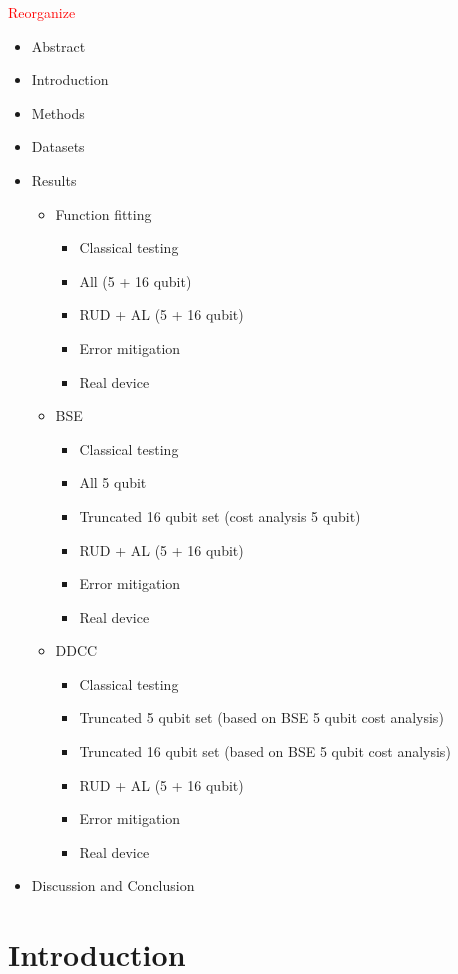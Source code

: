 \documentclass[journal=jacsat,manuscript=article]{achemso}
\begin{document}
\newpage
\textcolor{red}{Reorganize}
\begin{itemize}
	\item Abstract
	\item Introduction
	\item Methods
	\item Datasets
	\item Results
	\begin{itemize}
		\item Function fitting 
		\begin{itemize}
			\item Classical testing
			\item All (5 + 16 qubit)
			\item RUD + AL (5 + 16 qubit)
			\item Error mitigation
			\item Real device
		\end{itemize}
		\item BSE
		\begin{itemize}
			\item Classical testing
			\item All 5 qubit
			\item Truncated 16 qubit set (cost analysis 5 qubit)
			\item RUD + AL (5 + 16 qubit)
			\item Error mitigation
			\item Real device
		\end{itemize}		
		\item DDCC
		\begin{itemize}
			\item Classical testing
			\item Truncated  5 qubit set (based on BSE 5 qubit cost analysis)
			\item Truncated 16 qubit set (based on BSE 5 qubit cost analysis)
			\item RUD + AL (5 + 16 qubit)
			\item Error mitigation
			\item Real device
		\end{itemize}		
	\end{itemize}
	\item Discussion and Conclusion
\end{itemize}

\newpage
\section{Introduction}
\cite{prasad_applications_2024}
\cite{suzuki_predicting_2020}
\cite{mitarai_quantum_2018}
\cite{sim_expressibility_2019}
\cite{hatakeyama-sato_quantum_2023}
\cite{krenn_artificial_2023}
\cite{benedetti_parameterized_2019}
\cite{biamonte_quantum_2017}
\end{document}
